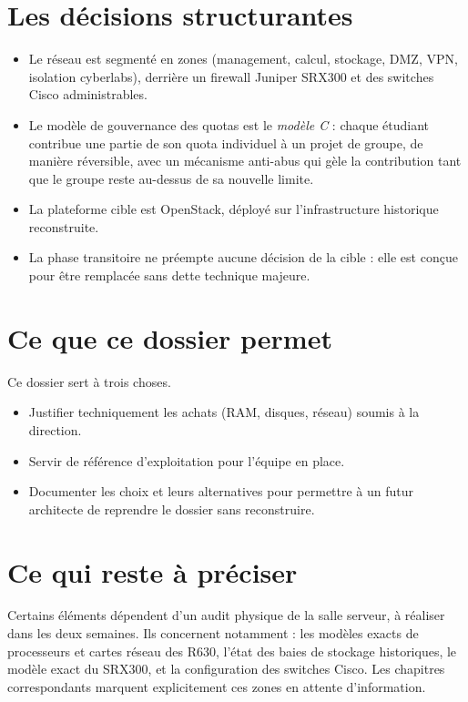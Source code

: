 \section*{Les décisions structurantes}
\begin{itemize}
  \item Le réseau est segmenté en zones (management, calcul, stockage, DMZ, VPN, isolation cyberlabs), derrière un firewall Juniper SRX300 et des switches Cisco administrables.
  \item Le modèle de gouvernance des quotas est le \emph{modèle C} : chaque étudiant contribue une partie de son quota individuel à un projet de groupe, de manière réversible, avec un mécanisme anti-abus qui gèle la contribution tant que le groupe reste au-dessus de sa nouvelle limite.
  \item La plateforme cible est OpenStack, déployé sur l'infrastructure historique reconstruite.
  \item La phase transitoire ne préempte aucune décision de la cible : elle est conçue pour être remplacée sans dette technique majeure.
\end{itemize}

\section*{Ce que ce dossier permet}
Ce dossier sert à trois choses.
\begin{itemize}
  \item Justifier techniquement les achats (RAM, disques, réseau) soumis à la direction.
  \item Servir de référence d'exploitation pour l'équipe en place.
  \item Documenter les choix et leurs alternatives pour permettre à un futur architecte de reprendre le dossier sans reconstruire.
\end{itemize}

\section*{Ce qui reste à préciser}
Certains éléments dépendent d'un audit physique de la salle serveur, à réaliser dans les deux semaines. Ils concernent notamment : les modèles exacts de processeurs et cartes réseau des R630, l'état des baies de stockage historiques, le modèle exact du SRX300, et la configuration des switches Cisco. Les chapitres correspondants marquent explicitement ces zones en attente d'information.